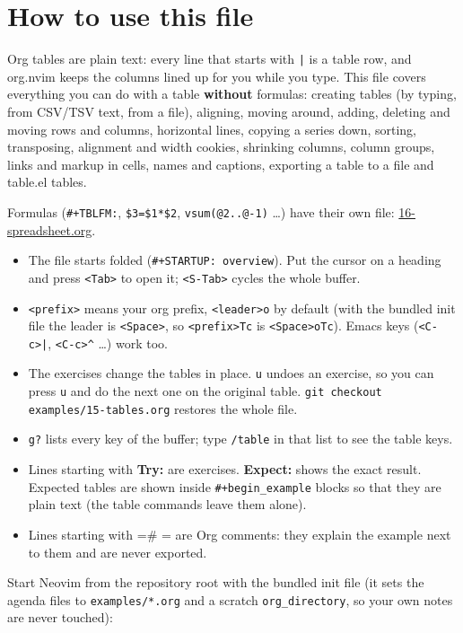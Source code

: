 \section{How to use this file}
\label{sec:orga368926}
Org tables are plain text: every line that starts with \texttt{|} is a table row,
and org.nvim keeps the columns lined up for you while you type. This file
covers everything you can do with a table \textbf{without} formulas: creating
tables (by typing, from CSV/TSV text, from a file), aligning, moving around,
adding, deleting and moving rows and columns, horizontal lines, copying a
series down, sorting, transposing, alignment and width cookies, shrinking
columns, column groups, links and markup in cells, names and captions,
exporting a table to a file and table.el tables.

Formulas (\texttt{\#+TBLFM:}, \texttt{\$3=\$1*\$2}, \texttt{vsum(@2..@-1)} \ldots{}) have their own file:
\href{16-spreadsheet.org}{16-spreadsheet.org}.

\begin{itemize}
\item The file starts folded (\texttt{\#+STARTUP: overview}). Put the cursor on a
heading and press \texttt{<Tab>} to open it; \texttt{<S-Tab>} cycles the whole buffer.
\item \texttt{<prefix>} means your org prefix, \texttt{<leader>o} by default (with the
bundled init file the leader is \texttt{<Space>}, so \texttt{<prefix>Tc} is
\texttt{<Space>oTc}). Emacs keys (\texttt{<C-c>|}, \texttt{<C-c>\textasciicircum{}} \ldots{}) work too.
\item The exercises change the tables in place. \texttt{u} undoes an exercise, so you
can press \texttt{u} and do the next one on the original table. \texttt{git checkout
  examples/15-tables.org} restores the whole file.
\item \texttt{g?} lists every key of the buffer; type \texttt{/table} in that list to see the
table keys.
\item Lines starting with \textbf{Try:} are exercises. \textbf{Expect:} shows the exact result.
Expected tables are shown inside \texttt{\#+begin\_example} blocks so that they are
plain text (the table commands leave them alone).
\item Lines starting with =\# = are Org comments: they explain the example next
to them and are never exported.
\end{itemize}

Start Neovim from the repository root with the bundled init file (it sets
the agenda files to \texttt{examples/*.org} and a scratch \texttt{org\_directory}, so your
own notes are never touched):

